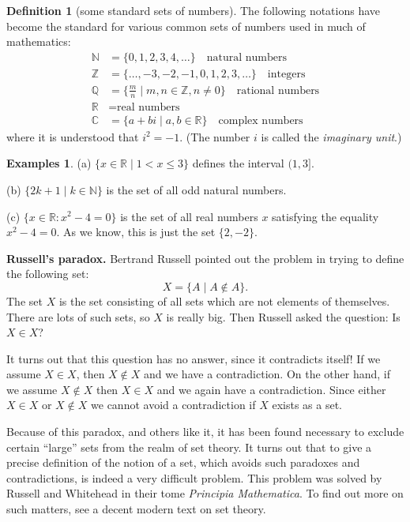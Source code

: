\documentclass[11pt]{article}
\theoremstyle{definition}
\newtheorem{defn}[thm]{Definition}
\newtheorem{examples}[thm]{Examples}
\newcommand{\R}{\mathbb{R}} %
\newcommand{\C}{\mathbb{C}} %
\newcommand{\Z}{\mathbb{Z}} %
\newcommand{\Q}{\mathbb{Q}} %
\newcommand{\N}{\mathbb{N}} %
\begin{document}
\begin{defn}[some standard sets of numbers]
  The following notations have become the standard for various common
  sets of numbers used in much of mathematics:
  \index{N@$\N$}\index{Z@$\Z$}\index{Q@$\Q$}\index{R@$\R$}\index{C@$\C$}%
  \begin{align*}
  \N &= \{0,1,2,3,4,\dots\}\quad \text{natural numbers}\\
  \Z &= \{\dots,-3,-2,-1,0,1,2,3,\dots\}\quad\text{integers}\\
  \Q &= \{ \tfrac{m}{n} \mid m,n \in \Z, n\ne 0 \}\quad\text{rational numbers}\\
  \R &= \text{real numbers}\\
  \C &= \{a+bi \mid a,b \in \R\}\quad \text{complex numbers}
  \end{align*}
  where it is understood that $i^2 = -1$. (The number $i$ is called
  the {\em imaginary unit}.)
\end{defn}

\begin{examples}
  (a) $\{x \in \R \mid 1 < x \le 3 \}$ defines the interval $(1,3]$.  

  (b) $\{2k+1 \mid k \in \N \}$ is the set of all odd natural numbers.

  (c) $\{x \in \R : x^2 - 4 = 0 \}$ is the set of all real numbers
  $x$ satisfying the equality $x^2 - 4 = 0$. As we know, this is just
  the set $\{ 2, -2 \}$.
\end{examples}


\textbf{Russell's paradox.}
Bertrand Russell pointed out the problem in trying to define the
following set:
\[
X = \{ A \mid A\notin A\}.
\]
The set $X$ is the set consisting of all sets which are not elements
of themselves. There are lots of such sets, so $X$ is really big.
Then Russell asked the question: Is $X\in X$? 

It turns out that this question has no answer, since it contradicts
itself!  If we assume $X\in X$, then $X\notin X$ and we have a
contradiction. On the other hand, if we assume $X\notin X$ then $X \in
X$ and we again have a contradiction. Since either $X\in X$ or
$X\notin X$ we cannot avoid a contradiction if $X$ exists as a set.

Because of this paradox, and others like it, it has been found
necessary to exclude certain ``large'' sets from the realm of set
theory. It turns out that to give a precise definition of the notion
of a set, which avoids such paradoxes and contradictions, is indeed a
very difficult problem. This problem was solved by Russell and
Whitehead in their tome {\em Principia Mathematica}. To find out more
on such matters, see a decent modern text on set theory.
\end{document}

